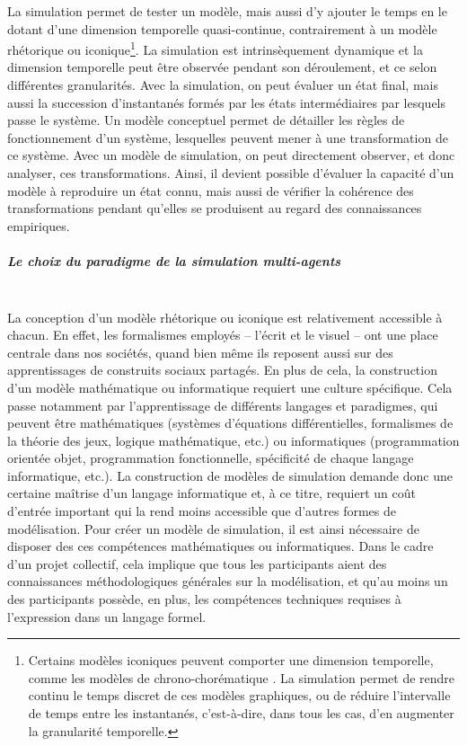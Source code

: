 La simulation permet de tester un modèle, mais aussi d'y ajouter le temps en le dotant d'une dimension temporelle quasi-continue, contrairement à un modèle \og rhétorique\fg{} ou \og iconique\fg{}\footnote{
	Certains modèles \og iconiques\fg{} peuvent comporter une dimension temporelle, comme les modèles de \og chrono-chorématique\fg{} \autocite{boissavit2005chrono,rodier2010dossier}.
	La simulation permet de rendre continu le temps discret de ces modèles graphiques, ou de réduire l'intervalle de temps entre les instantanés, c'est-à-dire, dans tous les cas, d'en augmenter la granularité temporelle. 
}.
La simulation est intrinsèquement dynamique et la dimension temporelle peut être observée pendant son déroulement, et ce selon différentes granularités.
Avec la simulation, on peut évaluer un état final, mais aussi la succession d'instantanés formés par les états intermédiaires par lesquels passe le système.
Un modèle conceptuel permet de détailler les règles de fonctionnement d'un système, lesquelles peuvent mener à une transformation de ce système.
Avec un modèle de simulation, on peut directement observer, et donc analyser, ces transformations.
Ainsi, il devient possible d'évaluer la capacité d'un modèle à reproduire un état connu, mais aussi de vérifier la cohérence des transformations pendant qu'elles se produisent au regard des connaissances empiriques.


\subparagraph{Le choix du paradigme de la simulation multi-agents}\mbox{}\\
La conception d'un modèle \og rhétorique\fg{} ou \og iconique\fg{} est relativement accessible à chacun. 
En effet, les formalismes employés -- l'écrit et le visuel -- ont une place centrale dans nos sociétés, quand bien même ils reposent aussi sur des apprentissages de construits sociaux partagés.
En plus de cela, la construction d'un modèle mathématique ou informatique requiert une culture spécifique.
Cela passe notamment par l'apprentissage de différents \og langages\fg{} et paradigmes, qui peuvent être mathématiques (systèmes d'équations différentielles, formalismes de la théorie des jeux, logique mathématique, etc.) ou informatiques (programmation orientée objet, programmation fonctionnelle, spécificité de chaque langage informatique, etc.).
La construction de modèles de simulation demande donc une certaine maîtrise d'un langage informatique et, à ce titre, requiert un coût d'entrée important qui la rend moins accessible que d'autres formes de modélisation.
Pour créer un modèle de simulation, il est ainsi nécessaire de disposer des ces compétences mathématiques ou informatiques.
Dans le cadre d'un projet collectif, cela implique que tous les participants aient des connaissances méthodologiques générales sur la modélisation, et qu'au moins un des participants possède, en plus, les compétences techniques requises à l'expression dans un langage formel.

